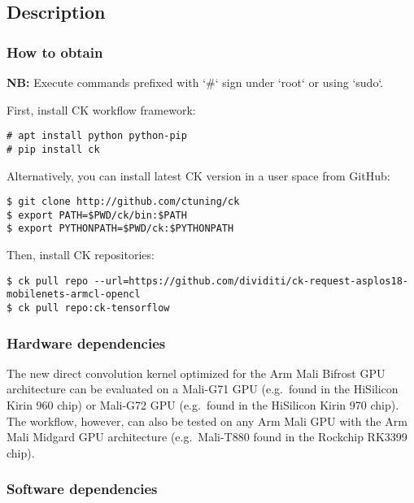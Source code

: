 \subsection{Description}

\subsubsection{How to obtain}

\textbf{NB:} Execute commands prefixed with `\#` sign under `root` or using `sudo`.

First, install CK workflow framework:

\begin{verbatim}
# apt install python python-pip
# pip install ck
\end{verbatim}

Alternatively, you can install latest CK version in a user space from GitHub:
\begin{verbatim}
$ git clone http://github.com/ctuning/ck
$ export PATH=$PWD/ck/bin:$PATH
$ export PYTHONPATH=$PWD/ck:$PYTHONPATH
\end{verbatim}

\noindent Then, install CK repositories:
\begin{verbatim}
$ ck pull repo --url=https://github.com/dividiti/ck-request-asplos18-mobilenets-armcl-opencl
$ ck pull repo:ck-tensorflow
\end{verbatim}

\subsubsection{Hardware dependencies}

The new direct convolution kernel optimized for the Arm Mali Bifrost GPU
architecture can be evaluated on a Mali-G71 GPU (e.g.\ found in the HiSilicon
Kirin 960 chip) or Mali-G72 GPU (e.g.\ found in the HiSilicon Kirin 970 chip).
%
The workflow, however, can also be tested on any Arm Mali GPU with the Arm Mali
Midgard GPU architecture (e.g.\ Mali-T880 found in the Rockchip RK3399 chip).

\subsubsection{Software dependencies}

